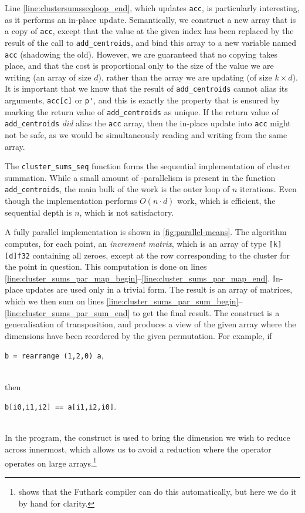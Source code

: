 Line \ref{line:clustersumsseqloop_end}, which updates \texttt{acc}, is
particularly interesting, as it performs an in-place update.
Semantically, we construct a new array that is a copy of \texttt{acc},
except that the value at the given index has been replaced by the
result of the call to \texttt{add\_centroids}, and bind this array to
a new variable named \texttt{acc} (shadowing the old).  However, we
are guaranteed that no copying takes place, and that the cost is
proportional only to the size of the value we are writing (an array of
size $d$), rather than the array we are updating (of size
$k\times{}d$).  It is important that we know that the result of
\lstinline{add_centroids} cannot alias its arguments,
\lstinline{acc[c]} or \lstinline{p'}, and this is exactly the property
that is ensured by marking the return value of
\lstinline{add_centroids} as unique.  If the return value of
\lstinline{add_centroids} \textit{did} alias the \lstinline{acc}
array, then the in-place update into \lstinline{acc} might not be
safe, as we would be simultaneously reading and writing from the same
array.

The \lstinline{cluster_sums_seq} function forms the sequential
implementation of cluster summation.  While a small amount of
-parallelism is present in the function
\lstinline{add_centroids}, the main bulk of the work is the outer loop
of $n$ iterations.  Even though the implementation performs
$O(n\cdot{}d)$ work, which is efficient, the sequential depth is $n$,
which is not satisfactory.

A fully parallel implementation is shown in \cref{fig:parallel-means}.
The algorithm computes, for each point, an \textit{increment matrix},
which is an array of type \lstinline{[k][d]f32} containing all zeroes,
except at the row corresponding to the cluster for the point in
question.  This computation is done on lines
\ref{line:cluster_sums_par_map_begin}--\ref{line:cluster_sums_par_map_end}.
In-place updates are used only in a trivial form.  The result is an
array of matrices, which we then sum on lines
\ref{line:cluster_sums_par_sum_begin}--\ref{line:cluster_sums_par_sum_end}
to get the final result.  The  construct is a
generalisation of transposition, and produces a view of the given
array where the dimensions have been reordered by the given permutation.  For example, if\\
\centerline{\lstinline{b = rearrange (1,2,0) a},}\\
then\\
\centerline{\lstinline{b[i0,i1,i2] == a[i1,i2,i0]}.}\\
In the program, the  construct is used to bring the
dimension we wish to reduce across innermost, which allows us to avoid
a reduction where the operator operates on large
arrays.\footnote{ shows that the Futhark
  compiler can do this automatically, but here we do it by hand for
  clarity.}

